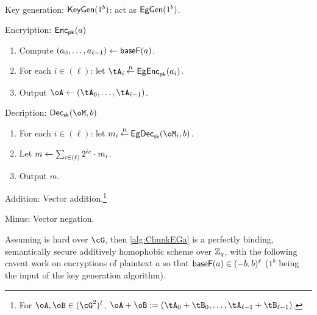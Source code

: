 \begin{algorithm}\label{alg:ChunkEGa}~
	
	\item[Key generation:] $\mathsf{KeyGen}(1^b)$: act as $\mathsf{EgGen}(1^b)$.
	
	\item[Encryiption:] $\mathsf{Enc}_{\mathsf{pk}}(a)$
	
	\begin{enumerate}
		\item Compute $(a_0,\ldots,a_{\ell-1}) \leftarrow \mathsf{baseF}(a)$.
		
		\item For each $i\in (\ell)$: let $\tA_i \getsr \EgEnc_\pk(a_i)$.
		
		\item Output $\oA \asn (\tA_0,\ldots, \tA_{\ell-1})$.
		
	\end{enumerate}
	 
	\item[Decription:] $\Dec_\sk(\oM,b)$   
	\begin{enumerate}
		\item 	 For each $i\in (\ell)$: let $m_i \getsr \EgDec_\sk(\oM_i,b)$.
		
		\item Let  $m \leftarrow \sum_{i \in (\ell)}   2^{i c} \cdot  m_i $.
		
		\item Output $m$.
	\end{enumerate}
	
	\item[Addition:] Vector addition.\footnote{For $\oA,\oB \in (\cG^2)^\ell$, $\oA +\oB \eqdef (\tA_0+\tB_0,\ldots,\tA_{\ell-1}+\tB_{\ell-1})$.}
	
	\item[Minus:]  Vector negation.
	                     
	
\end{algorithm}


\begin{theorem}\label{thm:EGinExp}
	Assuming \DDH is hard over $\cG$, then \cref{alg:ChunkEGa} is  a perfectly binding,  semantically secure additively homophobic scheme over ${\mathbb Z}_q$, with the following caveat work on encryptions of plaintext  $a$ so that $\mathsf{baseF}(a)\in (-b,b)^\ell$ ($1^b$ being the input of the key generation algorithm).
\end{theorem}


